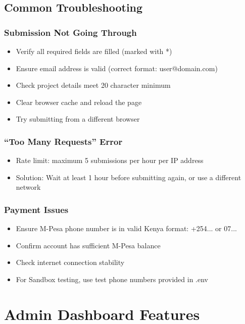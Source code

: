 \documentclass[12pt]{article}
\begin{document}
\subsection{Common Troubleshooting}

\subsubsection{Submission Not Going Through}
\begin{itemize}
  \item Verify all required fields are filled (marked with *)
  \item Ensure email address is valid (correct format: user@domain.com)
  \item Check project details meet 20 character minimum
  \item Clear browser cache and reload the page
  \item Try submitting from a different browser
\end{itemize}

\subsubsection{``Too Many Requests'' Error}
\begin{itemize}
  \item Rate limit: maximum 5 submissions per hour per IP address
  \item Solution: Wait at least 1 hour before submitting again, or use a different network
\end{itemize}

\subsubsection{Payment Issues}
\begin{itemize}
  \item Ensure M-Pesa phone number is in valid Kenya format: +254... or 07...
  \item Confirm account has sufficient M-Pesa balance
  \item Check internet connection stability
  \item For Sandbox testing, use test phone numbers provided in .env
\end{itemize}

\section{Admin Dashboard Features}
\end{document}
